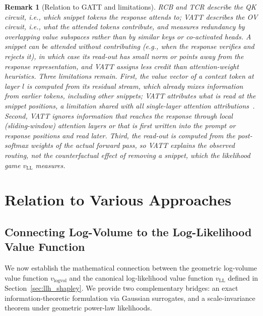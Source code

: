 \documentclass{article}
\newtheorem{remark}[theorem]{Remark}
\begin{document}
\begin{remark}[Relation to GATT and limitations]\label{rem:vatt_limitations}
RCB and TCR describe the QK circuit, i.e., \emph{which} snippet tokens the response attends to; VATT describes the OV circuit, i.e., \emph{what} the attended tokens contribute, and measures redundancy by overlapping value subspaces rather than by similar keys or co-activated heads. A snippet can be attended without contributing (e.g., when the response verifies and rejects it), in which case its read-out has small norm or points away from the response representation, and VATT assigns less credit than attention-weight heuristics. Three limitations remain. First, the value vector of a context token at layer $l$ is computed from its residual stream, which already mixes information from earlier tokens, including other snippets; VATT attributes what is read \emph{at} the snippet positions, a limitation shared with all single-layer attention attributions~\cite{abnar2020quantifying}. Second, VATT ignores information that reaches the response through local (sliding-window) attention layers or that is first written into the prompt or response positions and read later. Third, the read-out is computed from the post-softmax weights of the actual forward pass, so VATT explains the observed routing, not the counterfactual effect of removing a snippet, which the likelihood game $v_{\text{LL}}$ measures.
\end{remark}


\section{Relation to Various Approaches}

\subsection{Connecting Log-Volume to the Log-Likelihood Value Function}
\label{subsec:logvol_to_llh}

We now establish the mathematical connection between the geometric log-volume value function $v_{\text{logvol}}$ and the canonical log-likelihood value function $v_{\text{LL}}$ defined in Section~\ref{sec:llh_shapley}. We provide two complementary bridges: an exact information-theoretic formulation via Gaussian surrogates, and a scale-invariance theorem under geometric power-law likelihoods.
\end{document}
